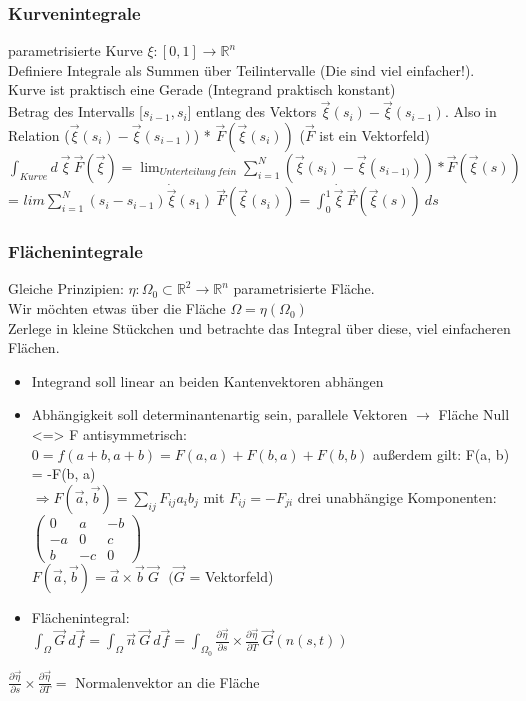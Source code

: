 \documentclass{article}
\begin{document}
\subsubsection{Kurvenintegrale}
parametrisierte Kurve $\xi: [0, 1] \longrightarrow \mathbb{R}^n$\\
Definiere Integrale als Summen über Teilintervalle (Die sind viel einfacher!).\\
Kurve ist praktisch eine Gerade (Integrand praktisch konstant)\\
Betrag des Intervalls [$s_{i-1}, s_i$] entlang des Vektors $\vec \xi(s_i) - \vec \xi(s_{i-1})$. Also in Relation ($\vec \xi(s_i) - \vec \xi(s_{i-1})$) * $\vec F(\vec \xi(s_i))$ ($\vec F$ ist ein Vektorfeld) \\
$\int_{Kurve} d ~\vec \xi ~ \vec F(\vec \xi) = \lim_{Unterteilung~fein} \sum_{i=1}^N (\vec \xi(s_i) - \vec \xi(s_{i-1)})) * \vec F(\vec \xi(s))$
 = $lim \sum_{i=1}^N (s_i-s_{i-1}) \dot{\vec \xi} (s_1) ~ \vec F(\vec \xi(s_i)) = \int_0^1 \dot{\vec \xi} ~ \vec F(\vec \xi(s)) ~ ds$
\subsubsection{Flächenintegrale}
Gleiche Prinzipien: $\eta: \Omega_0 \subset \mathbb{R}^2 \longrightarrow \mathbb{R}^n$ parametrisierte Fläche.\\
Wir möchten etwas über die Fläche $\Omega = \eta(\Omega_0)$\\
Zerlege in kleine Stückchen und betrachte das Integral über diese, viel einfacheren Flächen.
\begin{itemize}
\item Integrand soll linear an beiden Kantenvektoren abhängen 
\item Abhängigkeit soll determinantenartig sein, parallele Vektoren $\longrightarrow$ Fläche Null <=> F antisymmetrisch:\\
$0=f(a+b, a+b) = F(a, a) + F(b, a) + F(b, b)$ außerdem gilt: F(a, b) = -F(b, a)\\
$\Rightarrow F(\vec a, \vec b) = \sum_{ij} F_{ij} a_i b_j$ mit $F_{ij} = -F_{ji}$ drei unabhängige Komponenten: 
$
\begin{pmatrix}
0 & a & -b  \\
-a & 0 & c \\
b & -c & 0
\end{pmatrix}
$
\\
$F(\vec a, \vec b) = \vec a \times \vec b ~ \vec G ~~~(\vec G$ = Vektorfeld)\\
\item Flächenintegral:\\
$\int_\Omega \vec G~d\vec f = \int_\Omega \vec n ~\vec G ~ d\vec f = \int_{\Omega_0} \frac{\partial \vec \eta}{\partial s} \times \frac{\partial \vec \eta}{\partial T} ~ \vec G(n(s, t))$
\end{itemize}
$\frac{\partial \vec \eta}{\partial s} \times \frac{\partial \vec \eta}{\partial T} =$ Normalenvektor an die Fläche\\
\end{document}
